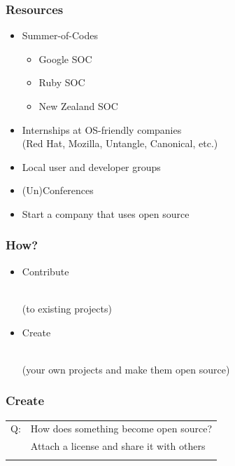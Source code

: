 \documentclass{beamer}
\begin{document}
\begin{frame}
  \frametitle{Resources}
  \begin{itemize}
  \item Summer-of-Codes
    \begin{itemize}
    \item Google SOC
    \item Ruby SOC
    \item New Zealand SOC
    \end{itemize}
  \item Internships at OS-friendly companies \\ (Red Hat, Mozilla, Untangle, Canonical, etc.)
  \item Local user and developer groups
  \item (Un)Conferences
  \item Start a company that uses open source
  \end{itemize}
\end{frame}

\begin{frame}
  \frametitle{How?}
  \begin{itemize}
    \setlength{\itemsep}{2em}
  \item \begin{LARGE} \textcolor{beamer@mygrey}{Contribute} \end{LARGE} \\ \textcolor{beamer@mygrey}{(to existing projects)}
  \item \begin{LARGE} \textcolor{beamer@myblue}{Create} \end{LARGE} \\ \textcolor{beamer@myblue}{(your own projects and make them open source)}
  \end{itemize}
\end{frame}

\begin{frame}
  \frametitle{Create}
  \begin{LARGE}
    \begin{tabular}{r l}
      Q: & How does something become open source? \\
      \only<2>{A: & Attach a \textcolor{beamer@myblue}{license} and \textcolor{beamer@myblue}{share} it with others \\}
    \end{tabular}
  \end{LARGE}
\end{frame}
\end{document}
